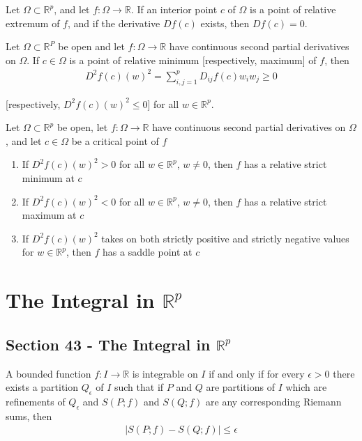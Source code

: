 \documentclass[12pt]{article}
\newcommand{\R}{\mathbb{R}}
\newenvironment{theorem}[2][Theorem]{\begin{trivlist}
\item[\hskip \labelsep {\bfseries #1}\hskip \labelsep {\bfseries #2.}]}{\end{trivlist}}
\newenvironment{corollary}[2][Corollary]{\begin{trivlist}
\item[\hskip \labelsep {\bfseries #1}\hskip \labelsep {\bfseries #2.}]}{\end{trivlist}}
\begin{document}
\begin{corollary}{42.2}
Let $\Omega \subset \R^p$, and let $f: \Omega \to \R$. If an interior point $c$ of $\Omega$ is a point of relative extremum of $f$, and if the derivative $Df(c)$ exists, then $Df(c) = 0$.
\end{corollary}

\begin{theorem}{42.4}
Let $\Omega \subset \R^P$ be open and let $f: \Omega \to \R$ have continuous second partial derivatives on $\Omega$. If $c \in \Omega$ is a point of relative minimum [respectively, maximum] of $f$, then
\begin{align*}
D^2f(c)(w)^2 = \sum_{i, j = 1}^p D_{ij}f(c)w_iw_j \geq 0
\end{align*}

[respectively, $D^2f(c)(w)^2 \leq 0$] for all $w \in \R^p$.
\end{theorem}

\begin{theorem}{42.5}
Let $\Omega \subset \R^p$ be open, let $f: \Omega \to \R$ have continuous second partial derivatives on $\Omega$, and let $c \in \Omega$ be a critical point of $f$
\begin{enumerate}[label=\alph*)]
\item If $D^2f(c)(w)^2 > 0$ for all $w \in \R^p$, $w \neq 0$, then $f$ has a relative strict minimum at $c$
\item If $D^2f(c)(w)^2 < 0$ for all $w \in \R^p$, $w \neq 0$, then $f$ has a relative strict maximum at $c$
\item If $D^2f(c)(w)^2$ takes on both strictly positive and strictly negative values for $w \in \R^p$, then $f$ has a saddle point at $c$
\end{enumerate}
\end{theorem}
\newpage
\section{The Integral in $\R^p$}

\subsection*{Section 43 - The Integral in $\mathbb{R}^p$}

\begin{theorem}[Cauchy]{Criterion}
A bounded function $f: I \to \R$ is integrable on $I$ if and only if for every $\epsilon > 0$ there exists a partition $Q_{\epsilon}$ of $I$ such that if $P$ and $Q$ are partitions of $I$ which are refinements of $Q_{\epsilon}$ and $S(P; f)$ and $S(Q; f)$ are any corresponding Riemann sums, then
\begin{align*}
|S(P; f) - S(Q; f)| \leq \epsilon
\end{align*}
\end{theorem}
\end{document}
